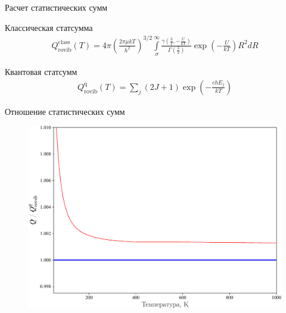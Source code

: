 \documentclass[10pt,pdf,hyperref={unicode},xcolor=dvipsnames]{beamer}
\newcommand{\lb}{\left(}
\newcommand{\rb}{\right)}
\begin{document}
\begin{frame}{Расчет статистических сумм}
    \begin{block}{Классическая статсумма}
        \begin{gather}
            Q^\text{class}_\text{rovib}(T) = 4 \pi \left( \frac{2 \pi \mu k T}{h^2} \right)^{3/2} \int\limits_\sigma^\infty \frac{\displaystyle \gamma \left( \frac{3}{2}, -\frac{U}{kT} \right)}{\displaystyle \Gamma \left( \frac{3}{2} \right)} \exp \left( -\frac{U}{kT} \right) R^2 d R 
        \end{gather}
    \end{block}
    \begin{block}{Квантовая статсумм}
        \begin{gather}
            Q^\text{q}_\text{rovib}(T) = \sum_{j} (2 J + 1) \exp \lb - \frac{c h E_j}{kT} \rb 
        \end{gather}
    \end{block}
\end{frame}

\begin{frame}{}
    \begin{block}{Отношение статистических сумм}
        \begin{figure}[H]
            \includegraphics[width=0.8\linewidth]{./pictures/ratio-crop.pdf}
        \end{figure}
    \end{block}
\end{frame}
\end{document}
